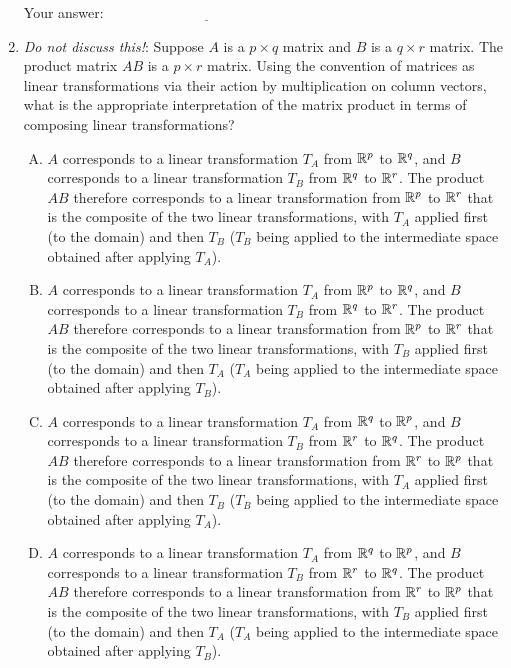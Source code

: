 \documentclass[10pt]{amsart}
\begin{document}
\begin{enumerate}
  \vspace{0.1in}
  Your answer: $\underline{\qquad\qquad\qquad\qquad\qquad\qquad\qquad}$
  \vspace{0.1in}

\item {\em Do not discuss this!}: Suppose $A$ is a $p \times q$ matrix
  and $B$ is a $q \times r$ matrix. The product matrix $AB$ is a $p
  \times r$ matrix. Using the convention of matrices as linear
  transformations via their action by multiplication on column vectors,
  what is the appropriate interpretation of the matrix product in
  terms of composing linear transformations?

  \begin{enumerate}[(A)]
  \item $A$ corresponds to a linear transformation $T_A$ from $\mathbb{R}^p$
    to $\mathbb{R}^q$, and $B$ corresponds to a linear transformation $T_B$
    from $\mathbb{R}^q$ to $\mathbb{R}^r$. The product $AB$ therefore corresponds to a
    linear transformation from $\mathbb{R}^p$ to $\mathbb{R}^r$ that is the composite
    of the two linear transformations, with $T_A$ applied first (to
    the domain) and then $T_B$ ($T_B$ being applied to the
    intermediate space obtained after applying $T_A$).
  \item $A$ corresponds to a linear transformation $T_A$ from $\mathbb{R}^p$
    to $\mathbb{R}^q$, and $B$ corresponds to a linear transformation $T_B$
    from $\mathbb{R}^q$ to $\mathbb{R}^r$. The product $AB$ therefore corresponds to a
    linear transformation from $\mathbb{R}^p$ to $\mathbb{R}^r$ that is the composite
    of the two linear transformations, with $T_B$ applied first (to
    the domain) and then $T_A$ ($T_A$ being applied to the
    intermediate space obtained after applying $T_B$).
  \item $A$ corresponds to a linear transformation $T_A$ from $\mathbb{R}^q$
    to $\mathbb{R}^p$, and $B$ corresponds to a linear transformation $T_B$
    from $\mathbb{R}^r$ to $\mathbb{R}^q$. The product $AB$ therefore corresponds to a
    linear transformation from $\mathbb{R}^r$ to $\mathbb{R}^p$ that is the composite
    of the two linear transformations, with $T_A$ applied first (to
    the domain) and then $T_B$ ($T_B$ being applied to the
    intermediate space obtained after applying $T_A$).
  \item $A$ corresponds to a linear transformation $T_A$ from $\mathbb{R}^q$
    to $\mathbb{R}^p$, and $B$ corresponds to a linear transformation $T_B$
    from $\mathbb{R}^r$ to $\mathbb{R}^q$. The product $AB$ therefore corresponds to a
    linear transformation from $\mathbb{R}^r$ to $\mathbb{R}^p$ that is the composite
    of the two linear transformations, with $T_B$ applied first (to
    the domain) and then $T_A$ ($T_A$ being applied to the
    intermediate space obtained after applying $T_B$).
  \end{enumerate}


\end{enumerate}
\end{document}
